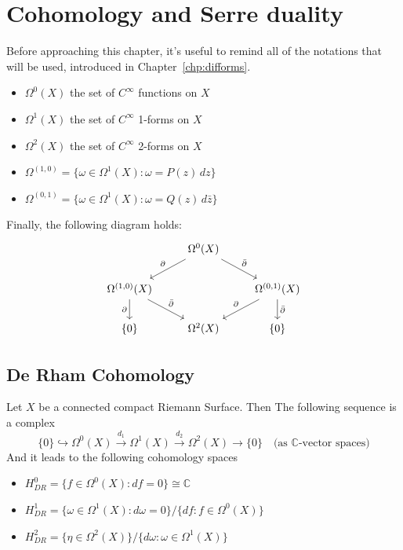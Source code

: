 \chapter{Cohomology and Serre duality}

Before approaching this chapter, it's useful to remind all of the notations that
will be used, introduced in Chapter~\ref{chp:difforms}.

\begin{itemize}[label = --]
    \item \(\Omega^{0}{(X)}\) the set of \(C^{\infty}\) functions on
\(X\)
    \item \(\Omega^{1}{(X)}\) the set of \(C^{\infty}\) 1-forms on \(X\) 
    \item \(\Omega^{2}{(X)}\) the set of \(C^{\infty}\) 2-forms on \(X\) 
    \item \(\Omega^{{(1,0)}} = \{\omega \in \Omega^{1}{(X)} : \omega = P{(z)}\,dz\} \) 
    \item \(\Omega^{{(0,1)}} = \{\omega \in \Omega^{1}{(X)} : \omega = Q{(z)}\,d\bar{z}\} \) 
\end{itemize}

Finally, the following diagram holds:
\[
\begin{tikzcd}
	& {\Omega^0(X)} & \\
	{\Omega^{(1,0)}(X)} && {\Omega^{(0,1)}(X)} \\
	{\{0\}} & {\Omega^2(X)} & {\{0\}}
	\arrow["\partial"', from=1-2, to=2-1]
	\arrow["{\bar{\partial}}", from=1-2, to=2-3]
	\arrow["\partial"', from=2-1, to=3-1]
	\arrow["{\bar{\partial}}", from=2-1, to=3-2]
	\arrow["\partial"', from=2-3, to=3-2]
	\arrow["{\bar{\partial}}", from=2-3, to=3-3]
\end{tikzcd}
\]

\section{De Rham Cohomology}
Let \(X\) be a connected compact Riemann Surface. Then The following sequence is
a complex
\[
  \{0\} \hookrightarrow \Omega^{0}{(X)} \overset{d_{1}}{\to} \Omega^{1}{(X)}
  \overset{d_{2}}{\to} \Omega^2{(X)} \to \{0\} \quad \text{(as \(\mathbb{C}\)-vector
  spaces)}
\]
And it leads to the following cohomology spaces
\begin{itemize}[label = --]
    \item \(H^{0}_{DR} = \{f \in  \Omega^{0}{(X)} : df = 0\} \cong \mathbb{C}\) 
    \item \(H^{1}_{DR} = \{\omega \in \Omega^{1}{(X)} : d\omega = 0\} /
        \{df : f \in \Omega^{0}{(X)}\} \) 
    \item \(H^{2}_{DR} = \{\eta \in \Omega^2{(X)}\} / \{d\omega : \omega \in
        \Omega^{1}{(X)}\}  \) 
\end{itemize}

